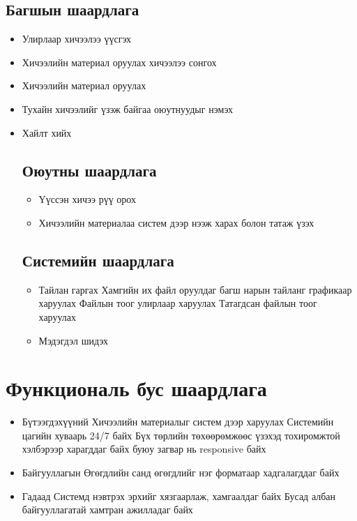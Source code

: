 \subsection{Багшын шаардлага}
\begin{itemize}
	
	\item Улирлаар хичээлээ үүсгэх
	\item Хичээлийн материал оруулах хичээлээ сонгох
	\item Хичээлийн материал оруулах
	\item Тухайн хичээлийг үзэж байгаа оюутнуудыг нэмэх
	\item Хайлт хийх
	
	\subsection{Оюутны шаардлага}
	\begin{itemize}
		\item Үүссэн хичээ рүү орох
		\item Хичээлийн материалаа систем дээр нээж харах болон татаж үзэх
	\end{itemize}
	
	\subsection{Системийн шаардлага}
	\begin{itemize}
		\item Тайлан гаргах
		\subitem Хамгийн их файл оруулдаг багш нарын тайланг графикаар харуулах
		\subitem Файлын тоог улирлаар харуулах
		\subitem Татагдсан файлын тоог харуулах
		\item Мэдэгдэл шидэх
	\end{itemize}
\end{itemize}
\section{Функциональ бус шаардлага}
\begin{itemize}
	\item Бүтээгдэхүүний 
	\subitem Хичээлийн материалыг систем дээр харуулах
	\subitem Системийн цагийн хуваарь 24/7 байх
	\subitem Бүх төрлийн төхөөрөмжөөс үзэхэд тохиромжтой хэлбэрээр харагддаг байх буюу загвар нь responsive байх
	
	\item Байгууллагын
	\subitem Өгөгдлийн санд өгөгдлийг нэг форматаар хадгалагддаг байх
	
	\item Гадаад
	\subitem Системд нэвтрэх эрхийг хязгаарлаж, хамгаалдаг байх
	\subitem Бусад албан байгууллагатай хамтран ажилладаг байх
\end{itemize}
\newpage
